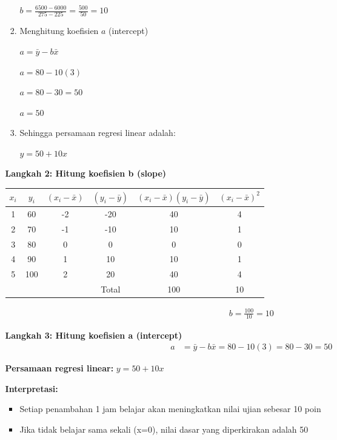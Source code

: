 \documentclass[a4paper]{article}
\begin{document}
\begin{enumerate}[itemsep=1em,leftmargin=*]
\begin{enumerate}
\begin{enumerate}[itemsep=1em,leftmargin=*]
      \(b = \frac{6500 - 6000}{275 - 225} = \frac{500}{50} = 10\)
      
      \item Menghitung koefisien $a$ (intercept)
      
      \(a = \bar{y} - b\bar{x}\)

      \(a = 80 - 10(3)\)

      \(a = 80 - 30 = 50\)

      \(a = 50\)

      \item Sehingga persamaan regresi linear adalah:
      
      \(y = 50 + 10x\)
      
    \end{enumerate}
    
    \textbf{Langkah 2: Hitung koefisien b (slope)}
    
    \begin{tabular}{|c|c|c|c|c|c|}
      \hline
      $x_i$ & $y_i$ & $(x_i - \bar{x})$ & $(y_i - \bar{y})$ & $(x_i - \bar{x})(y_i - \bar{y})$ & $(x_i - \bar{x})^2$ \\
      \hline
      1 & 60 & -2 & -20 & 40 & 4 \\
      2 & 70 & -1 & -10 & 10 & 1 \\
      3 & 80 & 0 & 0 & 0 & 0 \\
      4 & 90 & 1 & 10 & 10 & 1 \\
      5 & 100 & 2 & 20 & 40 & 4 \\
      \hline
      & & & Total & 100 & 10 \\
      \hline
    \end{tabular}
    
    \begin{align}
    b = \frac{100}{10} = 10
    \end{align}
    
    \textbf{Langkah 3: Hitung koefisien a (intercept)}
    \begin{align}
    a &= \bar{y} - b\bar{x} = 80 - 10(3) = 80 - 30 = 50
    \end{align}
    
    \textbf{Persamaan regresi linear:} $\boxed{y = 50 + 10x}$
    
    \textbf{Interpretasi:}
    \begin{itemize}
      \item Setiap penambahan 1 jam belajar akan meningkatkan nilai ujian sebesar 10 poin
      \item Jika tidak belajar sama sekali (x=0), nilai dasar yang diperkirakan adalah 50
    \end{itemize}


\end{enumerate}
\end{enumerate}
\end{document}
